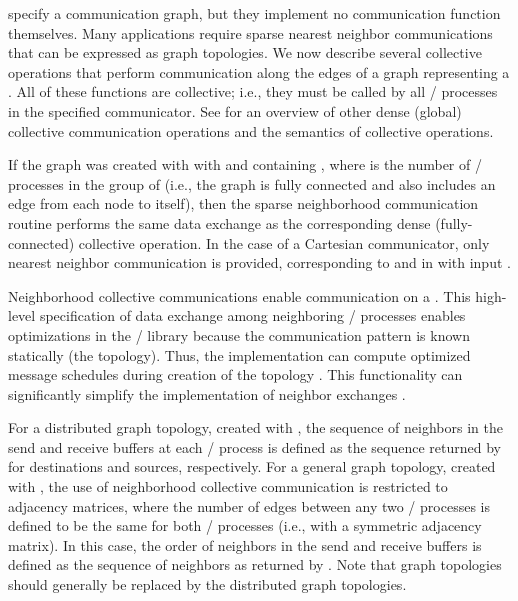  specify a communication graph, but they
implement no communication function themselves. Many applications
require sparse nearest neighbor communications that can be expressed as
graph topologies. We now describe several collective operations that
perform communication along the edges of a graph representing a . All of these
functions are collective; i.e., they must be called by all \MPI/ processes in
the specified communicator. See 
for an overview
of other dense (global) collective communication operations
and the semantics of collective operations.

If the graph was created with 
with  and  containing
, where  is the number of \MPI/ processes in the group
of 
(i.e., the graph is fully connected and also includes 
an edge from each node to itself),
then the sparse neighborhood communication routine performs the same data exchange
as the corresponding dense (fully-connected) collective operation. 
In the case of a Cartesian communicator, only nearest neighbor communication
is provided, corresponding to  and 
in  with input .

\begin{rationale}
Neighborhood collective communications enable communication on a .
This high-level specification of data exchange among
neighboring \MPI/ processes enables optimizations in the \MPI/ library because
the communication pattern is known statically (the topology).
Thus, the implementation can compute optimized message schedules during
creation of the topology \cite{hoefler-sparsecolls-hips}. This
functionality can significantly simplify the implementation of neighbor
exchanges \cite{hoefler-europvm08-qm}.
\end{rationale}

For a distributed graph topology, created with
, the sequence of neighbors in the
send and receive buffers at each \MPI/ process is defined as the sequence
returned by  for destinations and
sources, respectively. For a general graph topology, created with
, the use of neighborhood collective
communication is restricted to adjacency matrices, where the number of
edges between any two \MPI/ processes is defined to be the same for both
\MPI/ processes (i.e., with a symmetric adjacency matrix). In this case,
the order of neighbors in the send and
receive buffers is defined as the sequence of neighbors as returned by
. Note that graph topologies
should generally be replaced by the distributed graph topologies.

